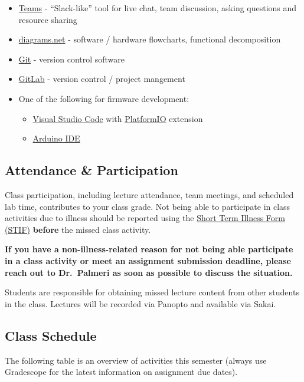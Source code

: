 \documentclass[10pt]{report}
\begin{document}
\begin{itemize}
    \item \href{https://teams.microsoft.com}{Teams} - ``Slack-like'' tool for live
    chat, team discussion, asking questions and resource sharing
    \item \href{https://diagrams.net}{diagrams.net} - software / hardware flowcharts, functional decomposition
    \item \href{https://git-scm.com/}{Git} - version control software
    \item \href{https://gitlab.oit.duke.edu}{GitLab} - version control / project mangement
    \item One of the following for firmware development:
    \begin{itemize}
        \item \href{https://code.visualstudio.com/}{Visual Studio Code} with \href{https://platformio.org/}{PlatformIO} extension
        \item \href{https://www.arduino.cc/en/software}{Arduino IDE}
    \end{itemize}
\end{itemize}

\subsection*{Attendance \& Participation}
Class participation, including lecture attendance, team meetings, and scheduled
lab time, contributes to your class grade. Not being able to participate in
class activities due to
 illness should be reported using the
\href{http://www.pratt.duke.edu/undergrad/policies/3531}{Short Term Illness
Form (STIF)} \textbf{before} the missed class activity.

\textbf{If you have a non-illness-related reason for not being able participate
in a class activity or meet an assignment submission deadline, please reach out
to Dr.\ Palmeri as soon as possible to discuss the situation.}

Students are responsible for obtaining missed lecture content from other
students in the class.  Lectures will be recorded via Panopto and available via
Sakai.

\subsection*{Class Schedule} 
The following table is an overview of activities this semester (always use
Gradescope for the latest information on assignment due dates).
\end{document}
